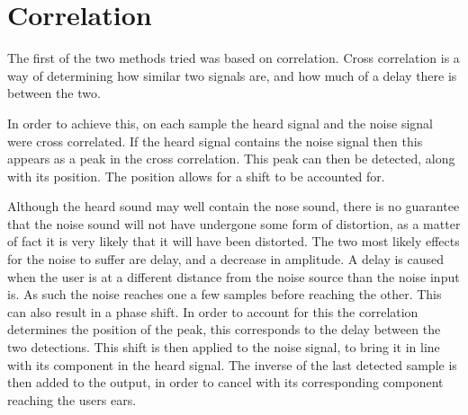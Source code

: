 \section{Correlation}

The first of the two methods tried was based on correlation.
Cross correlation is a way of determining how similar two signals are, and how much of a delay there is between the two.

In order to achieve this, on each sample the heard signal and the noise signal were cross correlated.
If the heard signal contains the noise signal then this appears as a peak in the cross correlation.
This peak can then be detected, along with its position.
The position allows for a shift to be accounted for.

Although the heard sound may well contain the nose sound, there is no guarantee that the noise sound will not have undergone some form of distortion, as a matter of fact it is very likely that it will have been distorted.
The two most likely effects for the noise to suffer are delay, and a decrease in amplitude.
A delay is caused when the user is at a different distance from the noise source than the noise input is.
As such the noise reaches one a few samples before reaching the other.
This can also result in a phase shift.
In order to account for this the correlation determines the position of the peak, this corresponds to the delay between the two detections.
This shift is then applied to the noise signal, to bring it in line with its component in the heard signal.
The inverse of the last detected sample is then added to the output, in order to cancel with its corresponding component reaching the users ears.
